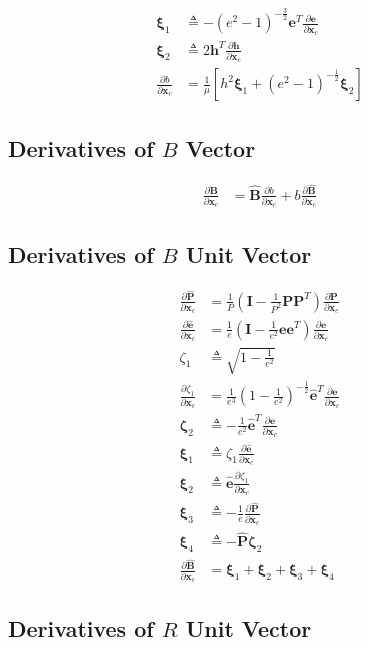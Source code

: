 \documentclass[]{article}
\newcommand{\vb}[1]{\bm{#1}} %
\newcommand{\vbh}[1]{\hat{\bm{#1}}} %
\newcommand{\pd}[2]{\frac{\partial #1}{\partial #2}} %
\newcommand{\xc}[0]{\vb{x}_c}
\begin{document}
\begin{align}
	\vb{\xi}_1 &\triangleq - \left( e^2 - 1 \right)^{-\frac{3}{2}} \vb{e}^T \pd{\vb{e}}{\xc} \\
	\vb{\xi}_2 &\triangleq 2 \vb{h}^T \pd{\vb{h}}{\xc} \\
	\pd{b}{\xc} &= \frac{1}{\mu} \left[ h^2 \vb{\xi}_1 + \left( e^2 - 1 \right)^{-\frac{1}{2}} \vb{\xi}_2 \right]
\end{align}

\subsection{Derivatives of $B$ Vector}

\begin{align}
	\pd{\vb{B}}{\xc} &= \vbh{B} \pd{b}{\xc} + b \pd{\vbh{B}}{\xc}
\end{align}

\subsection{Derivatives of $B$ Unit Vector}
\label{sec:cartesian2bplanejac_bunit}

\begin{align}
	\pd{\vbh{P}}{\xc} &= \frac{1}{P} \left( \vb{I} - \frac{1}{P^2} \vb{P} \vb{P}^T \right) \pd{\vb{P}}{\xc} \\
	\pd{\vbh{e}}{\xc} &= \frac{1}{e} \left( \vb{I} - \frac{1}{e^2} \vb{e} \vb{e}^T \right) \pd{\vb{e}}{\xc} \\
	\zeta_1 &\triangleq \sqrt{1 - \frac{1}{e^2}} \\
	\pd{\zeta_1}{\xc} &= \frac{1}{e^3} \left( 1 - \frac{1}{e^2} \right)^{-\frac{1}{2}} \vbh{e}^T \pd{\vb{e}}{\xc} \\
	\vb{\zeta}_2 &\triangleq -\frac{1}{e^2} \vbh{e}^T \pd{\vb{e}}{\xc} \\
	\vb{\xi}_1 &\triangleq \zeta_1 \pd{\vbh{e}}{\xc} \\
	\vb{\xi}_2 &\triangleq \vbh{e} \pd{\zeta_1}{\xc} \\
	\vb{\xi}_3 &\triangleq -\frac{1}{e} \pd{\vbh{P}}{\xc} \\
	\vb{\xi}_4 &\triangleq - \vbh{P} \vb{\zeta}_2 \\
	\label{eq:d_bunit_d_xc_in}
	\pd{\vbh{B}}{\xc} &= \vb{\xi}_1 + \vb{\xi}_2 + \vb{\xi}_3 + \vb{\xi}_4
\end{align}

\subsection{Derivatives of $R$ Unit Vector}
\end{document}
